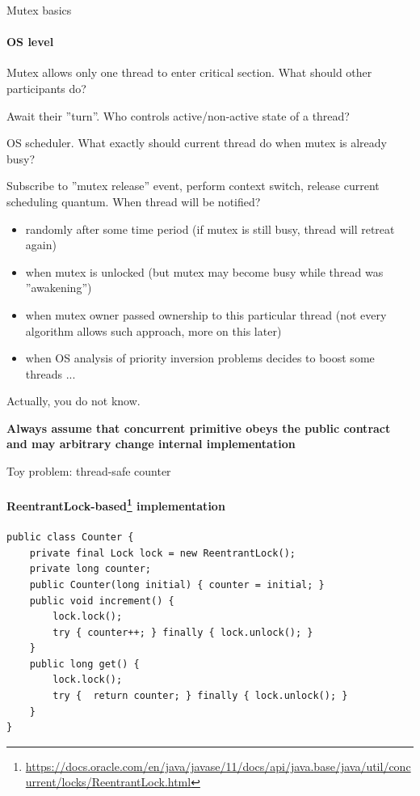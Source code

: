 \begin{frame}{Mutex basics}
\framesubtitle{OS level}

Mutex allows only one thread to enter critical section. What should other participants do?

\pause

Await their ''turn''. Who controls active/non-active state of a thread?

\pause

OS scheduler. What exactly should current thread do when mutex is already busy?

\pause

Subscribe to ''mutex release'' event, perform context switch, release current scheduling quantum. When thread will be notified?

\pause

\begin{itemize}
    \item randomly after some time period (if mutex is still busy, thread will retreat again)
    \pause
    \item when mutex is unlocked (but mutex may become busy while thread was ''awakening'')
    \pause
    \item when mutex owner passed ownership to this particular thread (not every algorithm allows such approach, more on this later)
    \pause
    \item when OS analysis of priority inversion problems decides to boost some threads
    \pause
    ... 
\end{itemize}

\pause

Actually, you do not know.

\pause

\textbf{Always assume that concurrent primitive obeys the public contract and may arbitrary change internal implementation}
\end{frame}



\begin{frame}[fragile]{Toy problem: thread-safe counter}
\framesubtitle{ReentrantLock-based\footnote{\tiny\url{https://docs.oracle.com/en/java/javase/11/docs/api/java.base/java/util/concurrent/locks/ReentrantLock.html}} implementation}

\begin{verbatim}
public class Counter {
    private final Lock lock = new ReentrantLock();
    private long counter;
    public Counter(long initial) { counter = initial; }
    public void increment() {
        lock.lock();
        try { counter++; } finally { lock.unlock(); }
    }
    public long get() { 
        lock.lock();
        try {  return counter; } finally { lock.unlock(); }
    }
}
\end{verbatim}

\end{frame}

